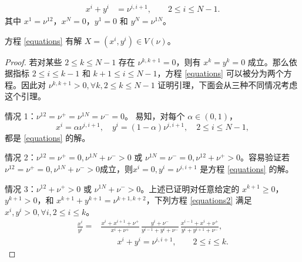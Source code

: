 \begin{appendices}
\begin{equation}
\begin{split}
    x^{i} + y^{i} &= \nu^{i,i+1},\qquad 2\le i\le N-1.
    \end{split}
\end{equation}
其中 $x^1=\nu^{12}$，$x^N=0$，$y^1=0$ 和 $y^N=\nu^{1N}$。
    \begin{lemma}\label{lemma:existence for equations solution}
        方程 \eqref{equations} 有解 $X=(x^i,y^i)\in V(\nu)$。
    \end{lemma}
\begin{proof}
    若对某些 $2\le k\le N-1$ 存在 $\nu^{k,k+1}=0$，则有 $x^{k}=y^{k}=0$ 成立。那么依据指标 $2\le i\le k-1$ 和 $k+1\le i\le N-1$，方程 \eqref{equations} 可以被分为两个方程。因此对 $\nu^{k,k+1}>0, \forall k, 2\le k\le N-1$ 证明引理，下面会从三种不同情况考虑这个引理。

    情况 1：$\nu^{12}=\nu^{+}=\nu^{1N}=\nu^-=0$。
    易知，对每个 $\alpha\in (0,1)$，
    \begin{equation*}
        x^{i}=\alpha\nu^{i,i+1},\quad y^{i}=(1-\alpha)\nu^{i,i+1},\quad 2\le i\le N-1,
    \end{equation*}
    都是 \eqref{equations} 的解。

    情况 2：$\nu^{12}=\nu^{+}=0,\nu^{1N}+\nu^{-}>0$ 或 $\nu^{1N}=\nu^{-}=0,\nu^{12}+\nu^{+}>0$。容易验证若 $\nu^{12}=\nu^{+}=0,\nu^{1N}+\nu^{-}>0$成立，则$x^{i}=0,y^{i}=\nu^{i,i+1}$ 是方程 \eqref{equations} 的解。

    情况 3：$\nu^{12}+\nu^{+}>0$ 或 $\nu^{1N}+\nu^{-}>0$。上述已证明对任意给定的 $x^{k+1}\ge 0$，$y^{k+1}>0$，和 $x^{k+1}+y^{k+1}=\nu^{k+1,k+2}$，下列方程 \eqref{equations2} 满足 $x^{i},y^{i}> 0, \forall i, 2\le i\le k$。
    \begin{equation}\label{equations2}
        \begin{split}
            \frac{x^{i}}{y^{i}}
            =&\frac{x^{i}+x^{i+1}+\nu^+}{x^{i}+\nu^+}\, \frac{y^{i}+\nu^-}{y^{i-1}+y^{i}+\nu^-}
            \,\frac{x^{i-1}+x^{i}+\nu^+}{y^{i}+y^{i+1}+\nu^-},\\
            &\qquad x^{i} + y^{i} = \nu^{i,i+1},\qquad 2\le i\le k.
        \end{split}
    \end{equation}


\end{proof}
\end{appendices}
